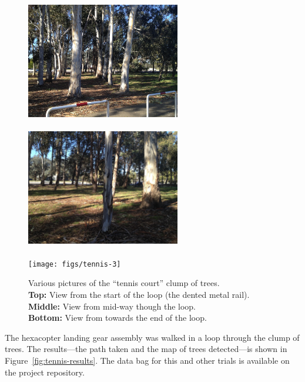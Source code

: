 \documentclass[12pt,oneside,a4paper]{book}
\begin{document}
\begin{figure}
  \centering
  \includegraphics[width=0.6\textwidth]{figs/tennis-1}\\
  ~\\
  \includegraphics[width=0.6\textwidth]{figs/tennis-2}\\
  ~\\
  \texttt{[image: figs/tennis-3]}\\
  \caption{Various pictures of the ``tennis court'' clump of trees.\\
  \textbf{Top:} View from the start of the loop (the dented metal
  rail).\\
  \textbf{Middle:} View from mid-way though the loop.\\
  \textbf{Bottom:} View from towards the end of the loop.}
  \label{fig:tennis-trees}
\end{figure}

The hexacopter landing gear assembly was walked in a loop through the
clump of trees. The results---the path taken and the map of trees
detected---is shown in Figure~\ref{fig:tennis-results}. The data bag
for this and other trials is available on the project repository.
\end{document}
